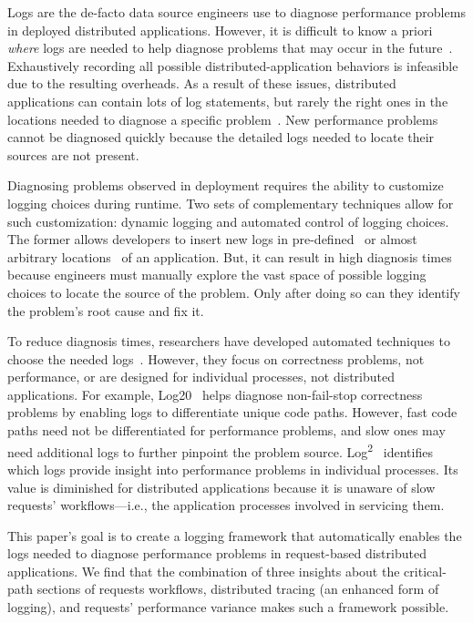 
Logs are the de-facto data source engineers use to diagnose
performance problems in deployed distributed applications.  However, it is
difficult to know a priori \textit{where} logs are needed to help
diagnose problems that may occur in the future~\cite{Zhao:2017co,
  Yuan:2012eh, Yuan:2012ws, Mace:2015uh}.  Exhaustively recording all
possible distributed-application behaviors is infeasible due to the
resulting overheads.  As a result of these issues, distributed
applications can contain lots of log statements, but rarely the right
ones in the locations needed to diagnose a specific
problem~\cite{Mace:2015uh, Yuan:2012eh}. New performance problems
cannot be diagnosed quickly because the detailed logs needed to locate
their sources are not present.

Diagnosing problems observed in deployment requires the ability to
customize logging choices during runtime.  Two sets of complementary
techniques allow for such customization: dynamic logging and automated
control of logging choices.  The former allows developers to insert
new logs in pre-defined~\cite{Erlingsson:2011wy,Mace:2015uh,
  Cantrill:2004dtrace} or almost arbitrary locations~\cite{kprobes} of
an application.  But, it can result in high diagnosis times because
engineers must manually explore the vast space of possible logging
choices to locate the source of the problem.  Only after doing so can
they identify the problem's root cause and fix it.

To reduce diagnosis times, researchers have developed automated
techniques to choose the needed logs~\cite{Zhao:2017co,
  ArumugaNainar:2010fx, Zuo:2016et, Liblit:2003ko, Ding:2015td}. However,
they focus on correctness problems, not performance, or are designed
for individual processes, not distributed
applications.  For example, Log20~\cite{Zhao:2017co} helps diagnose
non-fail-stop correctness problems by enabling logs to differentiate
unique code paths.  However, fast code paths need not be differentiated
for performance problems, and slow ones may need additional logs to
further pinpoint the problem source.
Log\textsuperscript{2}~\cite{Ding:2015td} identifies which logs
provide insight into performance problems in
individual processes. Its value is
  diminished for distributed applications because it is unaware of
  slow requests' workflows---i.e., the application processes involved
  in servicing them.

This paper's goal is to create a logging framework that automatically
enables the logs needed to diagnose performance problems in
request-based distributed applications.  We find that the combination
of three insights about the critical-path sections of requests
workflows, distributed tracing (an enhanced form of logging),
and requests' performance variance makes such a framework possible.

